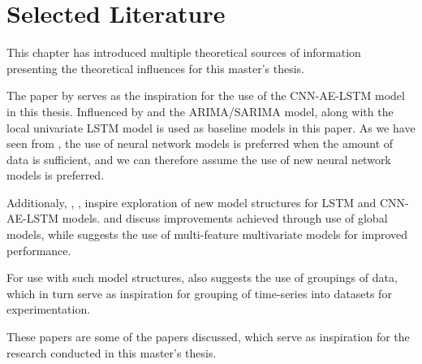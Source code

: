 
\section{Selected Literature}
\label{section:RelatedWork:SelectedLiterature}

This chapter has introduced multiple theoretical sources of information
presenting the theoretical influences for this master's thesis.

The paper by \cite{Zhao2019} serves as the inspiration for the use of the CNN-AE-LSTM model
in this thesis.
Influenced by \cite{Zhao2019} and \cite{Cerqueira2019} the ARIMA/SARIMA model, along with the local univariate LSTM model
is used as baseline models in this paper.
As we have seen from \cite{Cerqueira2019}, the use of neural network models is preferred when the amount of data is sufficient,
and we can therefore assume the use of new neural network models is preferred.

Additionaly, \cite{Montero-Manso2021}, \cite{Bandara2017}, \cite{Laptev} inspire exploration of new model structures for
LSTM and CNN-AE-LSTM models.
\cite{Montero-Manso2021} and \cite{Bandara2017} discuss improvements achieved through use of global models,
while \cite{Laptev} suggests the use of multi-feature multivariate models for improved performance.

For use with such model structures, \cite{Bandara2017} also suggests the use of groupings of data,
which in turn serve as inspiration for grouping of time-series into datasets for experimentation.

These papers are some of the papers discussed, which serve as inspiration for the research conducted in this master's thesis.



















